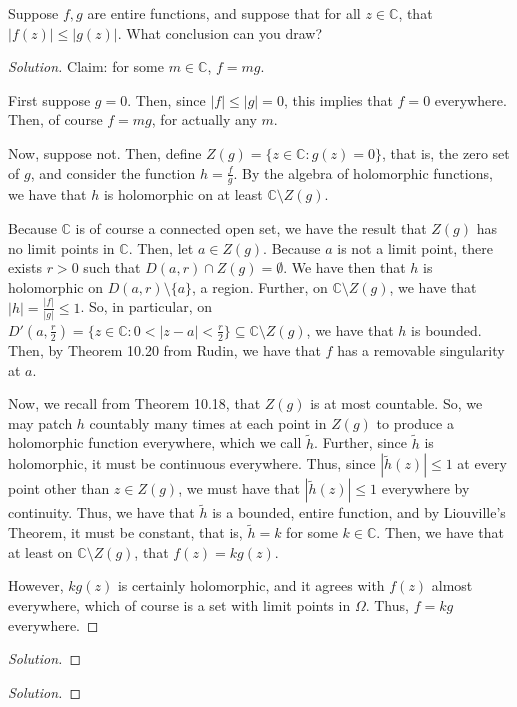 \documentclass[10pt]{article}
\newenvironment{problem}[2][]{\begin{trivlist}
\item[\hskip \labelsep {\bfseries #1}\hskip \labelsep {\bfseries #2.}]}{\end{trivlist}}
\begin{document}
\begin{problem}{Question 3}

Suppose $f, g$ are entire functions, and suppose that for all $z \in \mathbb{C}$, that $| f(z) | \leq | g(z)|$. What conclusion can you draw?

\end{problem}

\begin{proof}[Solution]

Claim: for some $m \in \mathbb{C}$, $f = mg$.

First suppose $g = 0$. Then, since $|f| \leq |g| = 0$, this implies that $f = 0$ everywhere. Then, of course $f = mg$, for actually any $m$.

Now, suppose not. Then, define $Z(g) = \{ z \in \mathbb{C} : g(z) = 0 \}$, that is, the zero set of $g$, and consider the function $h = \frac{f}{g}$. By the algebra of holomorphic functions, we have that $h$ is holomorphic on at least $\mathbb{C} \setminus Z(g)$.

Because $\mathbb{C}$ is of course a connected open set, we have the result that $Z(g)$ has no limit points in $\mathbb{C}$. Then, let $a \in Z(g)$. Because $a$ is not a limit point, there exists $r > 0$ such that $D(a,r) \cap Z(g) = \emptyset$. We have then that $h$ is holomorphic on $D(a,r) \setminus \{ a \}$, a region. Further, on $\mathbb{C} \setminus Z(g)$, we have that $|h| = \frac{|f|}{|g|} \leq 1$. So, in particular, on $D'(a,\frac{r}{2}) = \{ z \in \mathbb{C} : 0 < |z - a| < \frac{r}{2} \} \subseteq \mathbb{C} \setminus Z(g)$, we have that $h$ is bounded. Then, by Theorem 10.20 from Rudin, we have that $f$ has a removable singularity at $a$.

Now, we recall from Theorem 10.18, that $Z(g)$ is at most countable. So, we may patch $h$ countably many times at each point in $Z(g)$ to produce a holomorphic function everywhere, which we call $\tilde{h}$. Further, since $\tilde{h}$ is holomorphic, it must be continuous everywhere. Thus, since $|\tilde{h}(z)| \leq 1$ at every point other than $z \in Z(g)$, we must have that $|\tilde{h}(z)| \leq 1$ everywhere by continuity. Thus, we have that $\tilde{h}$ is a bounded, entire function, and by Liouville's Theorem, it must be constant, that is, $\tilde{h} = k$ for some $k \in \mathbb{C}$. Then, we have that at least on $\mathbb{C} \setminus Z(g)$, that $f(z) = k g(z)$.

However, $k g(z)$ is certainly holomorphic, and it agrees with $f(z)$ almost everywhere, which of course is a set with limit points in $\Omega$. Thus, $f = kg$ everywhere.


\end{proof}

\begin{problem}{Question 4}

\end{problem}

\begin{proof}[Solution]


\end{proof}

\begin{problem}{Question 5}

\end{problem}

\begin{proof}[Solution]

\end{proof}
\end{document}
